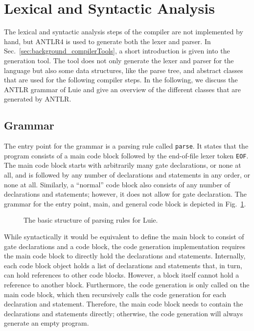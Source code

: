 \section{Lexical and Syntactic Analysis}
\label{sec:implementation_syntaxAnalysis}
The lexical and syntactic analysis steps of the compiler are not implemented by hand, but ANTLR4 is used to generate both the lexer and parser. In Sec.~\ref{sec:background_compilerTools}, a short introduction is given into the generation tool. The tool does not only generate the lexer and parser for the language but also some data structures, like the parse tree, and abstract classes that are used for the following compiler steps. In the following, we discuss the ANTLR grammar of Luie and give an overview of the different classes that are generated by ANTLR.

\subsection{Grammar}
\label{sec:implementation_grammar}
The entry point for the grammar is a parsing rule called \texttt{parse}. It states that the program consists of a main code block followed by the end-of-file lexer token \texttt{EOF}. The main code block starts with arbitrarily many gate declarations, or none at all, and is followed by any number of declarations and statements in any order, or none at all. Similarly, a ``normal'' code block also consists of any number of declarations and statements; however, it does not allow for gate declaration. The grammar for the entry point, main, and general code block is depicted in Fig.~\ref{fig:implementation_grammarStructure}.

\begin{figure}[htp]
    \centering
    
    \caption{The basic structure of parsing rules for Luie.}
    \label{fig:implementation_grammarStructure}
\end{figure}

While syntactically it would be equivalent to define the main block to consist of gate declarations and a code block, the code generation implementation requires the main code block to directly hold the declarations and statements. Internally, each code block object holds a list of declarations and statements that, in turn, can hold references to other code blocks. However, a block itself cannot hold a reference to another block. Furthermore, the code generation is only called on the main code block, which then recursively calls the code generation for each declaration and statement. Therefore, the main code block needs to contain the declarations and statements directly; otherwise, the code generation will always generate an empty program. 

